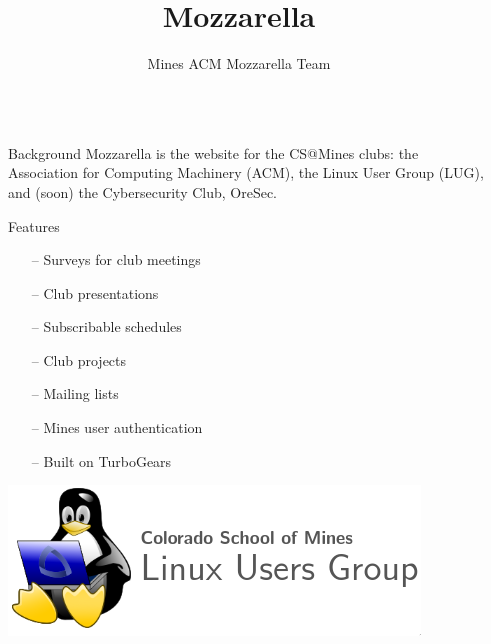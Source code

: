 \documentclass[final]{beamer}
\title{Mozzarella}
\author{Mines ACM Mozzarella Team}
\institute{Department of Computer Science, Colorado School of Mines}
\newlength{\sepwid}
\newlength{\onecolwid}
\begin{document}

    \setlength{\belowcaptionskip}{2ex} %
    \setlength\belowdisplayshortskip{2ex} %

    \begin{frame}[t] %
        \begin{columns}[t]
            \begin{column}{\sepwid}\end{column} %

            \begin{column}{\onecolwid} %

                \begin{block}{Background}
                    Mozzarella is the website for the CS@Mines clubs: the
		    Association for Computing Machinery (ACM), the Linux User
		    Group (LUG), and (soon) the Cybersecurity Club, OreSec.
                \end{block}

                \begin{block}{Features}
                    \begin{itemize}[leftmargin=8.75cm, labelsep=1cm]
                        \item[--] Surveys for club meetings
                        \item[--] Club presentations
                        \item[--] Subscribable schedules
                        \item[--] Club projects
                        \item[--] Mailing lists
                        \item[--] Mines user authentication
                        \item[--] Built on TurboGears
                    \end{itemize}
                \end{block}
		\includegraphics[width=.95\linewidth]{lug-logo.png}


\end{column}
\end{columns}
\end{frame}
\end{document}

